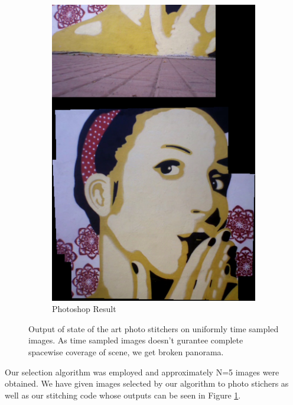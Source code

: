 \begin{figure}[t!]
\begin{subfigure}[b]{0.4\textwidth}
\includegraphics[width=\linewidth]{figures/sac3/uniform_sampled/photoshop.jpg}
\caption{Photoshop Result}
\end{subfigure}
\caption{Output of state of the art photo stitchers on uniformly time sampled
images. As time sampled images doesn't gurantee complete spacewise coverage of
scene, we get broken panorama.}
\label{fig:results_sac3_timesmapled}
\end{figure}

Our selection algorithm was employed and approximately N=5 images
were obtained. We have given images selected by our algorithm to photo stichers
as well as our stitching code whose outputs can be seen in Figure
\ref{fig:results_sac3_timesmapled}.
 
